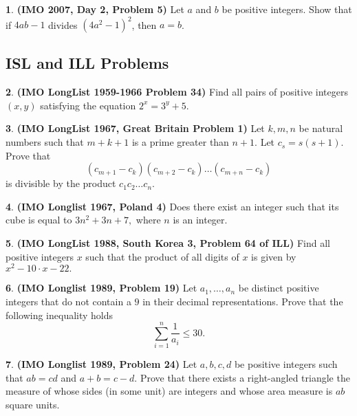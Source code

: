\documentclass{article}
\newcommand{\plus}{+}
\newcommand{\minus}{-}
\newcommand{\equal}{=}
\theoremstyle{definition}
\newtheorem{p}{}
\begin{document}
\begin{p}{\bf (IMO 2007, Day 2, Problem 5)}
Let $ a$ and $ b$ be positive integers. Show that if $ 4ab \minus{} 1$ divides $ (4a^{2} \minus{} 1)^{2}$, then $ a \equal{} b$.
\end{p}


\subsection{ISL and ILL Problems}




\begin{p}{\bf (IMO LongList 1959-1966 Problem 34)}
Find all pairs of positive integers $\left( x,y\right) $ satisfying the equation $2^{x}=3^{y}+5.$
\end{p}





\begin{p}{\bf (IMO LongList 1967, Great Britain Problem 1)}
Let $k,m,n$ be natural numbers such that $m+k+1$ is a prime greater than $n+1$. Let $c_s=s(s+1)$. Prove that 
\[(c_{m+1}-c_k)(c_{m+2}-c_k)\ldots(c_{m+n}-c_k)\] 
is divisible by the product $c_1c_2\ldots c_n$.
\end{p}






\begin{p}{\bf (IMO Longlist 1967, Poland 4)}
Does there exist an integer such that its cube is equal to $3n^2 + 3n + 7,$ where $n$ is an integer.
\end{p}



\begin{p}{\bf (IMO LongList 1988, South Korea 3, Problem 64 of ILL)}
Find all positive integers $x$ such that the product of all digits of $x$ is given by $x^2 - 10 \cdot x - 22.$
\end{p}





\begin{p}{\bf (IMO Longlist 1989, Problem 19)}
Let $ a_1, \ldots, a_n$ be distinct positive integers that do not contain a $ 9$ in their decimal representations. Prove that the following inequality holds
\[ \sum^n_{i\equal{}1} \frac{1}{a_i} \leq 30.\]
\end{p}




\begin{p}{\bf (IMO Longlist 1989, Problem 24)}
Let $ a, b, c, d$ be positive integers such that $ ab \equal{} cd$ and $ a\plus{}b \equal{} c \minus{} d.$ Prove that there exists a right-angled triangle the measure of whose sides (in some unit) are integers and whose area measure is $ ab$ square units.
\end{p}
\end{document}
